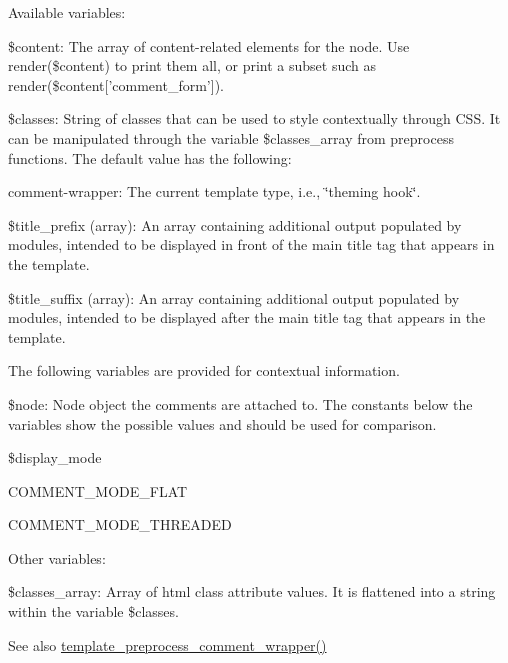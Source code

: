 Available variables:
\begin{DoxyItemize}
\item \$content: The array of content-\/related elements for the node. Use render(\$content) to print them all, or print a subset such as render(\$content\mbox{[}'comment\_\-form'\mbox{]}).
\item \$classes: String of classes that can be used to style contextually through CSS. It can be manipulated through the variable \$classes\_\-array from preprocess functions. The default value has the following:
\begin{DoxyItemize}
\item comment-\/wrapper: The current template type, i.e., \char`\"{}theming hook\char`\"{}.
\end{DoxyItemize}
\item \$title\_\-prefix (array): An array containing additional output populated by modules, intended to be displayed in front of the main title tag that appears in the template.
\item \$title\_\-suffix (array): An array containing additional output populated by modules, intended to be displayed after the main title tag that appears in the template.
\end{DoxyItemize}

The following variables are provided for contextual information.
\begin{DoxyItemize}
\item \$node: Node object the comments are attached to. The constants below the variables show the possible values and should be used for comparison.
\item \$display\_\-mode
\begin{DoxyItemize}
\item COMMENT\_\-MODE\_\-FLAT
\item COMMENT\_\-MODE\_\-THREADED
\end{DoxyItemize}
\end{DoxyItemize}

Other variables:
\begin{DoxyItemize}
\item \$classes\_\-array: Array of html class attribute values. It is flattened into a string within the variable \$classes.
\end{DoxyItemize}

\begin{DoxySeeAlso}{See also}
\hyperlink{comment_8module_aeccd0447ccb1d7a888c63c47444d54fc}{template\_\-preprocess\_\-comment\_\-wrapper()} 
\end{DoxySeeAlso}
